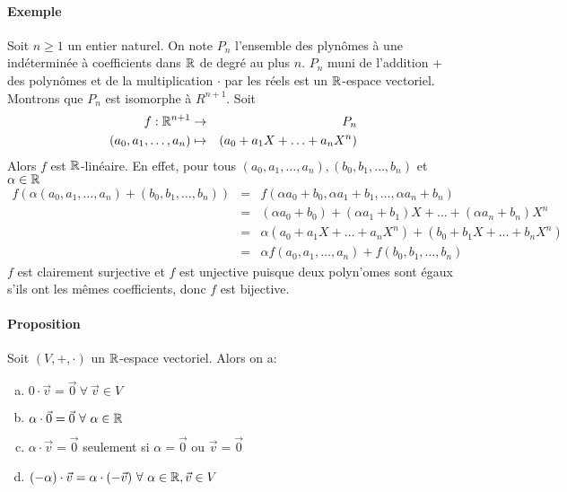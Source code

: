 \paragraph{Exemple} Soit $n\geq 1$ un entier naturel. On note $P_n$ l'ensemble des plynômes à une indéterminée à coefficients dans $\mathbb{R}$ de degré au plus $n$. $P_n$ muni de l'addition + des polynômes et de la multiplication $\cdot$ par les réels est un $\mathbb{R}$-espace vectoriel. Montrons que $P_n$ est isomorphe à $R^{n+1}$. Soit
\begin{eqnarray*}
f: \mathbb{R}^{n+1} &\rightarrow &P_n \\
(a_0, a_1, \dotsc, a_n)&\mapsto &(a_0+a_1X+\dotsc+a_nX^n)
\end{eqnarray*}
Alors $f$ est $\mathbb{R}$-linéaire. En effet, pour tous $(a_0, a_1, \dotsc, a_n),  (b_0, b_1, \dotsc, b_n)$ et $\alpha\in\mathbb{R}$
\begin{eqnarray*}
f(\alpha(a_0, a_1, \dotsc, a_n)+ (b_0, b_1, \dotsc, b_n))&=&f(\alpha a_0+b_0, \alpha a_1+b_1, \dotsc, \alpha a_n+b_n)\\
&=&(\alpha a_0+b_0)+ (\alpha a_1+b_1)X+ \dotsc+ (\alpha a_n+b_n)X^n\\
&=&\alpha(a_0+a_1X+\dotsc+a_nX^n)+(b_0+b_1X+\dotsc+b_nX^n)\\
&=&\alpha f(a_0, a_1, \dotsc, a_n)+f (b_0, b_1, \dotsc, b_n)
\end{eqnarray*}
$f$ est clairement surjective et $f$ est unjective puisque deux polyn'omes sont égaux s'ils ont les mêmes coefficients, donc $f$ est bijective.

\paragraph{Proposition} Soit $(V, +, \cdot)$ un $\mathbb{R}$-espace vectoriel. Alors on a:
\begin{enumerate}[a)]
  \item $0\cdot \vec{v} = \vec{0} ~\forall~ \vec{v} \in V$
  \item $\alpha \cdot \vec{0} = \vec{0} ~\forall~ \alpha \in \mathbb{R}$
  \item $\alpha \cdot \vec{v} = \vec{0}$ seulement si $\alpha = \vec{0}$ ou $\vec{v} = \vec{0}$
  \item $(-\alpha)\cdot \vec{v} = \alpha \cdot (-\vec{v}) ~\forall~ \alpha \in \mathbb{R}, \vec{v} \in V$
\end{enumerate}

